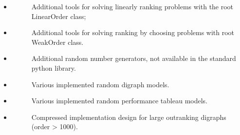 \documentclass[letterpaper,10pt,english]{sphinxmanual}
\begin{document}
\begin{itemize}
\begin{description}
\end{description}

\item {} \begin{description}
\item[{{\hyperref[techDoc:linearorders-label]{\emph{}}}}] \leavevmode
Additional tools for solving linearly ranking problems with the root LinearOrder class;

\end{description}

\item {} \begin{description}
\item[{{\hyperref[techDoc:weakorders-label]{\emph{}}}}] \leavevmode
Additional tools for solving ranking by choosing problems with root WeakOrder class.

\end{description}

\item {} \begin{description}
\item[{{\hyperref[techDoc:randomnumbers-label]{\emph{}}}}] \leavevmode
Additional random number generators, not available in the standard python library.

\end{description}

\item {} \begin{description}
\item[{{\hyperref[techDoc:randomdigraphs-label]{\emph{}}}}] \leavevmode
Various implemented random digraph models.

\end{description}

\item {} \begin{description}
\item[{{\hyperref[techDoc:randomperftabs-label]{\emph{}}}}] \leavevmode
Various implemented random performance tableau models.

\end{description}

\item {} \begin{description}
\item[{{\hyperref[techDoc:bigoutrankingdigraphs-label]{\emph{}}}}] \leavevmode
Compressed implementation design for large outranking digraphs (order \textgreater{} 1000).

\end{description}

\end{itemize}
\end{document}
